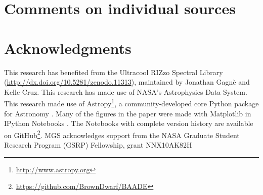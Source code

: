 \documentclass[12pt,preprint]{aastex}
\begin{document}
\section{Comments on individual sources}


\section{Acknowledgments}

This research has benefited from the Ultracool RIZzo Spectral Library (\url{http://dx.doi.org/10.5281/zenodo.11313}), maintained by Jonathan Gagn\`{e} and Kelle Cruz.  This research has made use of NASA's Astrophysics Data System.  This research made use of Astropy\footnote{\url{http://www.astropy.org}}, a community-developed core Python package for Astronomy \citep{2013A&A...558A..33A}.  Many of the figures in the paper were made with Matplotlib \citep{Hunter:2007} in IPython Notebooks \citep{PER-GRA:2007}.  The Notebooks with complete version history are available on GitHub\footnote{\url{https://github.com/BrownDwarf/BAADE}}.  MGS acknowledges support from the NASA Graduate Student Research Program (GSRP) Fellowship, grant NNX10AK82H

\clearpage




\end{document}
